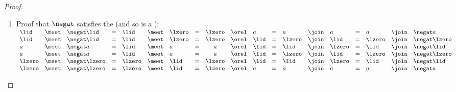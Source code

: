 \begin{proof}
\begin{enumerate}
  \item Proof that $\negat$ satisfies the  (and so is a ):
    \\\indentx$\begin{array}{lcl c lcl c c c l c lcl c lcl}
       \lid   &\meet&  \negat\lid   &=& \lid   &\meet& \lzero &=& \lzero &\orel& a    &=& a     &\join&a      &=& a     &\join&\negat a      \\
       \lid   &\meet&  \negat\lid   &=& \lid   &\meet& \lzero &=& \lzero &\orel& \lid &=& \lzero&\join&\lid   &=& \lzero&\join&\negat\lzero \\
       a      &\meet&  \negat a      &=& \lid   &\meet& a      &=& a      &\orel& \lid &=& \lid  &\join&\lzero &=& \lid  &\join&\negat\lid   \\
       a      &\meet&  \negat a      &=& \lid   &\meet& a      &=& a      &\orel& \lid &=& \lzero&\join&\lid   &=& \lzero&\join&\negat\lzero \\
       \lzero &\meet&  \negat\lzero &=& \lzero &\meet& \lid   &=& \lzero &\orel& \lid &=& \lid  &\join&\lzero &=& \lid  &\join&\negat\lid   \\
       \lzero &\meet&  \negat\lzero &=& \lzero &\meet& \lid   &=& \lzero &\orel& a    &=& a     &\join&a      &=& a     &\join&\negat a
     \end{array}$
\end{enumerate}
\end{proof}

